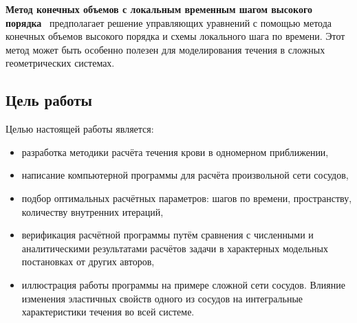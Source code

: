 {\bf Метод конечных объемов с локальным временным шагом высокого порядка}~\cite{mueller:2015} предполагает решение управляющих уравнений 
с помощью метода конечных объемов высокого порядка и схемы локального шага по времени. 
Этот метод может быть особенно полезен для моделирования течения в сложных геометрических системах.

\subsection{Цель работы}
Целью настоящей работы является:
\begin{itemize}
\item разработка методики расчёта течения крови в одномерном приближении,
\item написание компьютерной программы для расчёта произвольной сети сосудов,
\item подбор оптимальных расчётных параметров: шагов по времени, пространству, количеству внутренних итераций,
\item верификация расчётной программы путём сравнения с численными и аналитическими результатами расчётов задачи в характерных модельных постановках от других авторов,
\item иллюстрация работы программы на примере сложной сети сосудов. Влияние изменения эластичных свойств одного из сосудов на интегральные характеристики течения 
      во всей системе.
\end{itemize}
